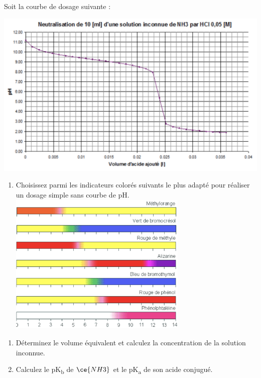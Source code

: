 \documentclass[
  11pt,
  french,
  a4paper,
  openany]{book}
\providecommand{\tightlist}{%
  \setlength{\itemsep}{0pt}\setlength{\parskip}{0pt}}
\begin{document}
\begin{Exercise}

Soit la courbe de dosage suivante :

\includegraphics[width=1\textwidth,height=\textheight]{images/acides-bases-ex-1.png}

\begin{enumerate}
\def\labelenumi{\alph{enumi}.}
\tightlist
\item
  Choisissez parmi les indicateurs colorés suivants le plus adapté pour réaliser un dosage simple sans courbe de pH.\\
  \includegraphics[width=0.67\textwidth,height=\textheight]{images/acides-bases-ex-2.png}
\end{enumerate}

\clearpage

\begin{enumerate}
\def\labelenumi{\alph{enumi}.}
\setcounter{enumi}{1}
\tightlist
\item
  Déterminez le volume équivalent et calculez la concentration de la solution inconnue.
\item
  Calculez le pK\textsubscript{b} de \(\ce{NH3}\) et le pK\textsubscript{a} de son acide conjugué.
\end{enumerate}


\end{Exercise}
\end{document}
